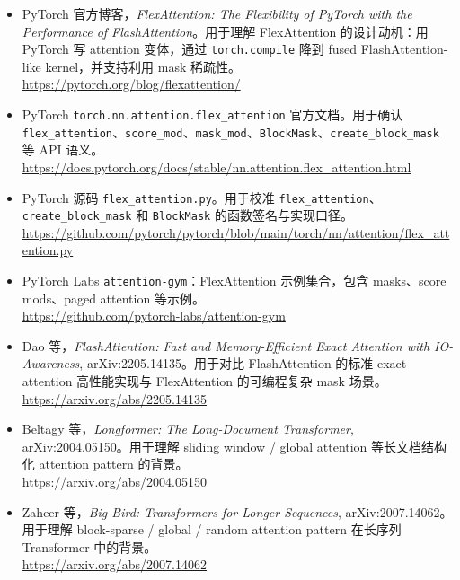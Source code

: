 \begingroup
\small
\sloppy
\begin{itemize}[leftmargin=1.5em]
  \item PyTorch 官方博客，\emph{FlexAttention: The Flexibility of PyTorch with the Performance of FlashAttention}。用于理解 FlexAttention 的设计动机：用 PyTorch 写 attention 变体，通过 \texttt{torch.compile} 降到 fused FlashAttention-like kernel，并支持利用 mask 稀疏性。\\
  \url{https://pytorch.org/blog/flexattention/}
  \item PyTorch \texttt{torch.nn.attention.flex\_attention} 官方文档。用于确认 \texttt{flex\_attention}、\texttt{score\_mod}、\texttt{mask\_mod}、\texttt{BlockMask}、\texttt{create\_block\_mask} 等 API 语义。\\
  \url{https://docs.pytorch.org/docs/stable/nn.attention.flex_attention.html}
  \item PyTorch 源码 \texttt{flex\_attention.py}。用于校准 \texttt{flex\_attention}、\texttt{create\_block\_mask} 和 \texttt{BlockMask} 的函数签名与实现口径。\\
  \url{https://github.com/pytorch/pytorch/blob/main/torch/nn/attention/flex_attention.py}
  \item PyTorch Labs \texttt{attention-gym}：FlexAttention 示例集合，包含 masks、score mods、paged attention 等示例。\\
  \url{https://github.com/pytorch-labs/attention-gym}
  \item Dao 等，\emph{FlashAttention: Fast and Memory-Efficient Exact Attention with IO-Awareness}, arXiv:2205.14135。用于对比 FlashAttention 的标准 exact attention 高性能实现与 FlexAttention 的可编程复杂 mask 场景。\\
  \url{https://arxiv.org/abs/2205.14135}
  \item Beltagy 等，\emph{Longformer: The Long-Document Transformer}, arXiv:2004.05150。用于理解 sliding window / global attention 等长文档结构化 attention pattern 的背景。\\
  \url{https://arxiv.org/abs/2004.05150}
  \item Zaheer 等，\emph{Big Bird: Transformers for Longer Sequences}, arXiv:2007.14062。用于理解 block-sparse / global / random attention pattern 在长序列 Transformer 中的背景。\\
  \url{https://arxiv.org/abs/2007.14062}
\end{itemize}
\endgroup

